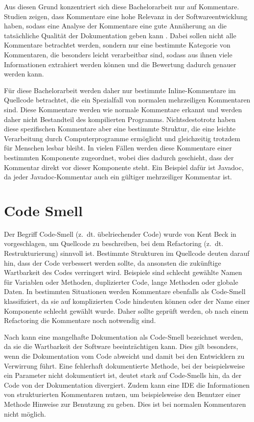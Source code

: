 Aus diesen Grund konzentriert sich diese Bachelorarbeit nur auf Kommentare. Studien zeigen, dass Kommentare eine hohe Relevanz in der Softwareentwicklung haben, sodass eine Analyse der Kommentare eine gute Annäherung an die tatsächliche Qualität der Dokumentation geben kann \cite[S. 71]{AStudyoftheDocumentationEssentialtoSoftwareMaintenance}. Dabei sollen nicht alle Kommentare betrachtet werden, sondern nur eine bestimmte Kategorie von Kommentaren, die besonders leicht verarbeitbar sind, sodass aus ihnen viele Informationen extrahiert werden können und die Bewertung dadurch genauer werden kann. 

Für diese Bachelorarbeit werden daher nur bestimmte Inline-Kommentare im Quellcode betrachtet, die ein Spezialfall von normalen mehrzeiligen Kommentaren sind.
Diese Kommentare werden wie normale Kommentare erkannt und werden daher nicht Bestandteil des kompilierten Programms. Nichtsdestotrotz haben diese spezifischen Kommentare aber eine bestimmte Struktur, die eine leichte Verarbeitung durch Computerprogramme ermöglicht und gleichzeitig trotzdem für Menschen lesbar bleibt. In vielen Fällen werden diese Kommentare einer bestimmten Komponente zugeordnet, wobei dies dadurch geschieht, dass der Kommentar direkt vor dieser Komponente steht. Ein Beispiel dafür ist Javadoc, da jeder Javadoc-Kommentar auch ein gültiger mehrzeiliger Kommentar ist.





\section{Code Smell}\label{chapter:code_smell}
Der Begriff Code-Smell (z.~dt. übelriechender Code)  wurde von Kent Beck in \cite[S. 71 ff.]{fowler2019refactoring}  vorgeschlagen, um Quellcode zu beschreiben, bei dem Refactoring (z.~dt. Restrukturierung) sinnvoll ist. Bestimmte Strukturen im Quellcode deuten darauf hin, dass der Code verbessert werden sollte, da ansonsten die zukünftige Wartbarkeit des Codes verringert wird. Beispiele sind schlecht gewählte Namen für Variablen oder Methoden, duplizierter Code, lange Methoden oder globale Daten. In bestimmten Situationen werden Kommentare ebenfalls als Code-Smell klassifiziert, da sie auf komplizierten  Code hindeuten können oder der Name einer Komponente schlecht gewählt wurde. Daher sollte geprüft werden, ob nach einem Refactoring die Kommentare noch notwendig sind.

Nach \cite[S. 249-250]{JavadocViolationsandTheirEvolutioninOpen-SourceSoftware} kann eine mangelhafte Dokumentation als Code-Smell bezeichnet werden, da sie die Wartbarkeit der Software beeinträchtigen kann. Dies gilt besonders, wenn die Dokumentation vom Code abweicht und damit bei den Entwicklern zu Verwirrung führt. Eine fehlerhaft dokumentierte Methode, bei der beispielsweise ein Parameter nicht dokumentiert ist, deutet stark auf Code-Smells hin, da der Code von der Dokumentation divergiert. Zudem kann eine \ac{IDE} die Informationen von strukturierten Kommentaren nutzen, um beispielsweise den Benutzer einer Methode Hinweise zur Benutzung zu geben. Dies ist bei normalen Kommentaren nicht möglich. 

